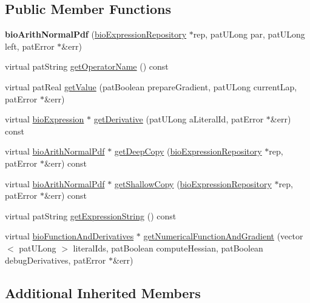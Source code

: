 \subsection*{Public Member Functions}
\begin{DoxyCompactItemize}
\item 
\mbox{\label{classbio_arith_normal_pdf_a65b70d94c42bc2e70ac52b7dba179db1}} 
{\bfseries bio\+Arith\+Normal\+Pdf} (\hyperlink{classbio_expression_repository}{bio\+Expression\+Repository} $\ast$rep, pat\+U\+Long par, pat\+U\+Long left, pat\+Error $\ast$\&err)
\item 
virtual pat\+String \hyperlink{classbio_arith_normal_pdf_ae2ad20d8db8f935fa7de1f4a0fd3288e}{get\+Operator\+Name} () const
\item 
virtual pat\+Real \hyperlink{classbio_arith_normal_pdf_a6b9af77b48e6a3eb8441df836be67d40}{get\+Value} (pat\+Boolean prepare\+Gradient, pat\+U\+Long current\+Lap, pat\+Error $\ast$\&err)
\item 
virtual \hyperlink{classbio_expression}{bio\+Expression} $\ast$ \hyperlink{classbio_arith_normal_pdf_a25ab081a2c88449126a328a5eb635818}{get\+Derivative} (pat\+U\+Long a\+Literal\+Id, pat\+Error $\ast$\&err) const
\item 
virtual \hyperlink{classbio_arith_normal_pdf}{bio\+Arith\+Normal\+Pdf} $\ast$ \hyperlink{classbio_arith_normal_pdf_af001f9bda79d1518e2c9913c02f98a37}{get\+Deep\+Copy} (\hyperlink{classbio_expression_repository}{bio\+Expression\+Repository} $\ast$rep, pat\+Error $\ast$\&err) const
\item 
virtual \hyperlink{classbio_arith_normal_pdf}{bio\+Arith\+Normal\+Pdf} $\ast$ \hyperlink{classbio_arith_normal_pdf_aeec0c66c4ba5c8ae0ee9d35be0bf1eb9}{get\+Shallow\+Copy} (\hyperlink{classbio_expression_repository}{bio\+Expression\+Repository} $\ast$rep, pat\+Error $\ast$\&err) const
\item 
virtual pat\+String \hyperlink{classbio_arith_normal_pdf_af63b696ee818be0597345caf08d0b3d1}{get\+Expression\+String} () const
\item 
virtual \hyperlink{classbio_function_and_derivatives}{bio\+Function\+And\+Derivatives} $\ast$ \hyperlink{classbio_arith_normal_pdf_ab55fce91dd0740f61c7026426602e996}{get\+Numerical\+Function\+And\+Gradient} (vector$<$ pat\+U\+Long $>$ literal\+Ids, pat\+Boolean compute\+Hessian, pat\+Boolean debug\+Derivatives, pat\+Error $\ast$\&err)
\end{DoxyCompactItemize}
\subsection*{Additional Inherited Members}


